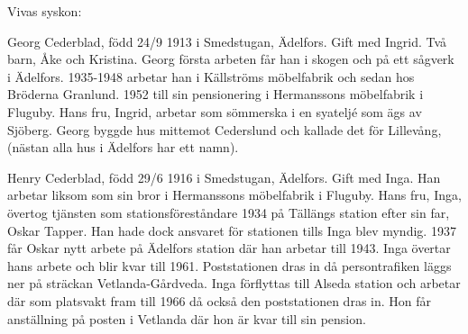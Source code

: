 Vivas syskon:

Georg Cederblad, född 24/9 1913 i Smedstugan, Ädelfors. Gift med Ingrid. Två barn, Åke och Kristina.
Georg första arbeten får han i skogen och på ett sågverk i Ädelfors. 1935-1948 arbetar han i Källströms möbelfabrik och sedan hos Bröderna Granlund. 1952 till sin pensionering i Hermanssons möbelfabrik i Fluguby.
Hans fru, Ingrid, arbetar som sömmerska i en syateljé som ägs av Sjöberg. 
Georg byggde hus mittemot Cederslund och kallade det för Lillevång, (nästan alla hus i Ädelfors har ett namn).

Henry Cederblad, född 29/6 1916 i Smedstugan, Ädelfors. Gift med Inga.
Han arbetar liksom som sin bror i Hermanssons möbelfabrik i Fluguby.
Hans fru, Inga, övertog tjänsten som stationsföreståndare 1934 på Tällängs station efter sin far, Oskar Tapper. Han hade dock ansvaret för stationen tills Inga blev myndig. 1937 får Oskar nytt arbete på Ädelfors station där han arbetar till 1943. Inga övertar hans arbete och blir kvar till 1961. Poststationen dras in då persontrafiken läggs ner på sträckan Vetlanda-Gårdveda. Inga förflyttas till Alseda station och arbetar där som platsvakt fram till 1966 då också den poststationen dras in. Hon får anställning på posten i Vetlanda där hon är kvar till sin pension.